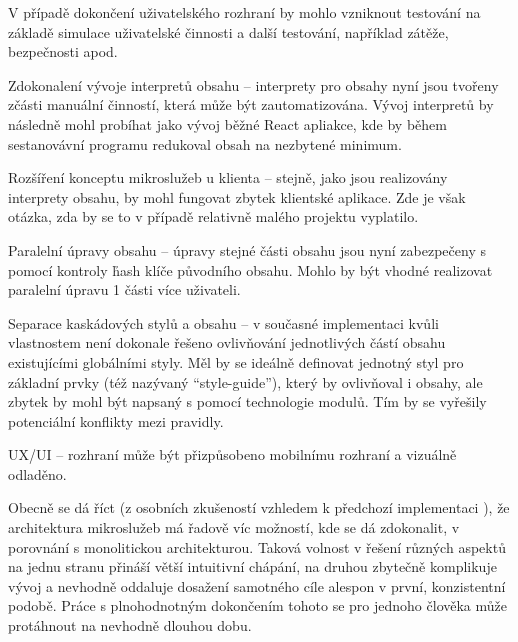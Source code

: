 \begin{dl}
   V případě dokončení uživatelského rozhraní by mohlo vzniknout testování na základě simulace uživatelské činnosti a další testování, například zátěže, bezpečnosti apod.
   \item[Zdokonalení vývoje interpretů obsahu] – interprety pro obsahy nyní jsou tvořeny zčásti manuální činností, která může být zautomatizována.
   Vývoj interpretů by následně mohl probíhat jako vývoj běžné React apliakce, kde by během sestanovávní programu redukoval obsah na nezbytené minimum.
   \item[Rozšíření konceptu mikroslužeb u klienta] – stejně, jako jsou realizovány interprety obsahu, by mohl fungovat zbytek klientské aplikace.
   Zde je však otázka, zda by se to v případě relativně malého projektu vyplatilo.
   \item[Paralelní úpravy obsahu] – úpravy stejné části obsahu jsou nyní zabezpečeny s pomocí kontroly \h{hash} klíče původního obsahu.
   Mohlo by být vhodné realizovat paralelní úpravu 1 části více uživateli.
   \item[Separace kaskádových stylů a obsahu] – v současné implementaci kvůli vlastnostem  není dokonale řešeno ovlivňování jednotlivých částí obsahu existujícími globálními styly.
   Měl by se ideálně definovat jednotný styl pro základní prvky (též nazývaný \enquote{style-guide}), který by ovlivňoval i obsahy, ale zbytek by mohl být napsaný s pomocí technologie  modulů.
   Tím by se vyřešily potenciální konflikty mezi  pravidly.
   \item[UX/UI] – rozhraní může být přizpůsobeno mobilnímu rozhraní a vizuálně odladěno.
\end{dl}

Obecně se dá říct (z osobních zkušeností vzhledem k předchozí implementaci ), že architektura mikroslužeb má řadově víc možností, kde se dá zdokonalit, v porovnání s monolitickou architekturou.
Taková volnost v řešení různých aspektů na jednu stranu přináší větší intuitivní chápání, na druhou zbytečně komplikuje vývoj a nevhodně oddaluje dosažení samotného cíle alespon v první, konzistentní podobě.
Práce s plnohodnotným dokončením tohoto  se pro jednoho člověka může protáhnout na nevhodně dlouhou dobu.
